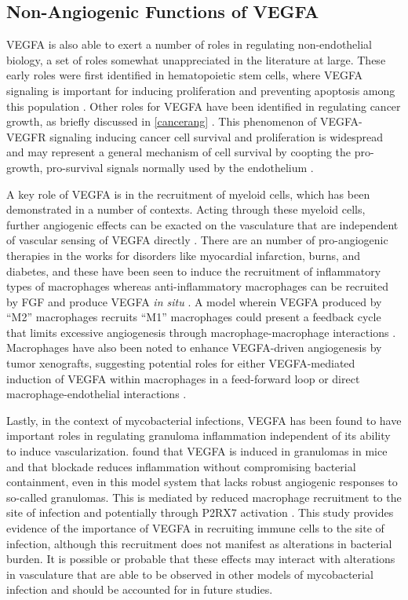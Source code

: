 \subsection{Non\hyp{}Angiogenic Functions of VEGFA}

VEGFA is also able to exert a number of roles in regulating non\hyp{}endothelial biology, a set of roles somewhat unappreciated in the literature at large. These early roles were first identified in hematopoietic stem cells, where VEGFA signaling is important for inducing proliferation and preventing apoptosis among this population \citep{Gerber2002}. Other roles for VEGFA have been identified in regulating cancer growth, as briefly discussed in \autoref{cancerang} \citep{Goel2013}. This phenomenon of VEGFA\hyp{}VEGFR signaling inducing cancer cell survival and proliferation is widespread and may represent a general mechanism of cell survival by coopting the pro\hyp{}growth, pro\hyp{}survival signals normally used by the endothelium \citep{Wiszniak2021, Mercurio2005}. 

A key role of VEGFA is in the recruitment of myeloid cells, which has been demonstrated in a number of contexts. Acting through these myeloid cells, further angiogenic effects can be exacted on the vasculature that are independent of vascular sensing of VEGFA directly \citep{Cursiefen2004}. There are an number of pro\hyp{}angiogenic therapies in the works for disorders like myocardial infarction, burns, and diabetes, and these have been seen to induce the recruitment of inflammatory types of macrophages whereas anti\hyp{}inflammatory macrophages can be recruited by FGF and produce VEGFA \textit{in situ} \citep{Lucerna2007}. A model wherein VEGFA produced by ``M2'' macrophages recruits ``M1'' macrophages could present a feedback cycle that limits excessive angiogenesis through macrophage\hyp{}macrophage interactions \citep{Barbay2015}. Macrophages have also been noted to enhance VEGFA\hyp{}driven angiogenesis by tumor xenografts, suggesting potential roles for either VEGFA\hyp{}mediated induction of VEGFA within macrophages in a feed\hyp{}forward loop or direct macrophage\hyp{}endothelial interactions \citep{Britto2018}.

Lastly, in the context of mycobacterial infections, VEGFA has been found to have important roles in regulating granuloma inflammation independent of its ability to induce vascularization. \citet{Harding2019} found that VEGFA is induced in granulomas in mice and that blockade reduces inflammation without compromising bacterial containment, even in this model system that lacks robust angiogenic responses to so\hyp{}called granulomas. This is mediated by reduced macrophage recruitment to the site of infection and potentially through P2RX7 activation \citep{Matty2019}. This study provides evidence of the importance of VEGFA in recruiting immune cells to the site of infection, although this recruitment does not manifest as alterations in bacterial burden. It is possible or probable that these effects may interact with alterations in vasculature that are able to be observed in other models of mycobacterial infection and should be accounted for in future studies.

